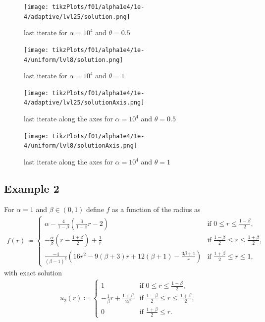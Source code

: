 \documentclass[draft=false,twoside,12pt]{scrreprt}
\begin{document}
\begin{minipage}[t]{0.45\textwidth}
  \begin{figure}[H]
	  \centering
		\texttt{[image: tikzPlots/f01/alpha1e4/1e-4/adaptive/lvl25/solution.png]} 
    \caption{last iterate for $\alpha=10^4$ and $\theta = 0.5$}
  \end{figure}
\end{minipage}
\hfill
\vline
\hfill
\begin{minipage}[t]{0.45\textwidth}
  \begin{figure}[H]
	  \centering
		\texttt{[image: tikzPlots/f01/alpha1e4/1e-4/uniform/lvl8/solution.png]} 
    \caption{last iterate for $\alpha=10^4$ and $\theta = 1$}
  \end{figure}
\end{minipage}

\vspace{-\parskip}
\begin{minipage}[t]{0.45\textwidth}
  \begin{figure}[H]
	  \centering
		\texttt{[image: tikzPlots/f01/alpha1e4/1e-4/adaptive/lvl25/solutionAxis.png]} 
    \caption{last iterate along the axes for $\alpha=10^4$ and $\theta = 0.5$}
  \end{figure}
\end{minipage}
\hfill
\vline
\hfill
\begin{minipage}[t]{0.45\textwidth}
  \begin{figure}[H]
	  \centering
		\texttt{[image: tikzPlots/f01/alpha1e4/1e-4/uniform/lvl8/solutionAxis.png]} 
    \caption{last iterate along the axes for $\alpha=10^4$ and $\theta = 1$}
  \end{figure}
\end{minipage}

\subsection{Example 2}
For $\alpha=1$ and $\beta\in(0,1)$ define $f$ as a function of the radius as
\begin{align*}
  f(r)\coloneqq 
  \begin{cases}
    \alpha - \frac{4}{1-\beta}\left(\frac{3}{1-\beta}r - 2\right) &
    \text{if } 0\leq r\leq\frac{1-\beta}{2},\\
    -\frac{\alpha}{\beta}\left( r-\frac{1+\beta}{2} \right) +\frac{1}{r} & 
    \text{if } \frac{1-\beta}{2}\leq r\leq \frac{1+\beta}{2},\\
    \frac{-4}{(\beta-1)^3}
    \left( 16r^2 -9(\beta+3)r + 12(\beta+1) - \frac{3\beta+1}{r}\right) & 
    \text{if } \frac{1+\beta}{2}\leq r\leq 1,
  \end{cases}
\end{align*}
with exact solution
\begin{align*}
  u_2(r)\coloneqq 
  \begin{cases}
    1 & \text{if } 0\leq r\leq\frac{1-\beta}{2},\\
    -\frac{1}{\beta}r + \frac{1+\beta}{2\beta} & 
    \text{if } \frac{1-\beta}{2}\leq r\leq \frac{1+\beta}{2},\\
    0 & \text{if } \frac{1+\beta}{2}\leq r.
  \end{cases}
\end{align*}
\end{document}
